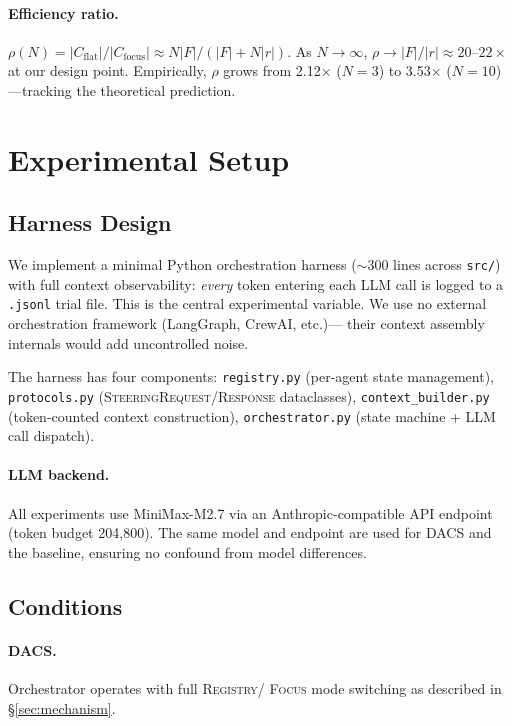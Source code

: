 \documentclass{article}
\begin{document}
\paragraph{Efficiency ratio.}
$\rho(N) = |C_{\text{flat}}| / |C_{\text{focus}}| \approx N|F| / (|F| +
N|r|)$.
As $N \to \infty$, $\rho \to |F| / |r| \approx 20$--$22\times$ at our
design point.
Empirically, $\rho$ grows from 2.12$\times$ ($N=3$) to 3.53$\times$
($N=10$)—tracking the theoretical prediction.

\section{Experimental Setup}
\label{sec:experiments}

\subsection{Harness Design}
\label{sec:harness}

We implement a minimal Python orchestration harness ($\sim$300 lines
across \texttt{src/}) with full context observability: \emph{every} token
entering each LLM call is logged to a \texttt{.jsonl} trial file.
This is the central experimental variable.
We use no external orchestration framework (LangGraph, CrewAI, etc.)—
their context assembly internals would add uncontrolled noise.

The harness has four components:
\texttt{registry.py} (per-agent state management),
\texttt{protocols.py} (\textsc{SteeringRequest/Response} dataclasses),
\texttt{context\_builder.py} (token-counted context construction),
\texttt{orchestrator.py} (state machine + LLM call dispatch).

\paragraph{LLM backend.}
All experiments use MiniMax-M2.7 via an Anthropic-compatible API endpoint
(token budget 204{,}800).
The same model and endpoint are used for DACS and the baseline, ensuring
no confound from model differences.

\subsection{Conditions}
\label{sec:conditions}

\paragraph{DACS.} Orchestrator operates with full \textsc{Registry}/
\textsc{Focus} mode switching as described in \S\ref{sec:mechanism}.
\end{document}
